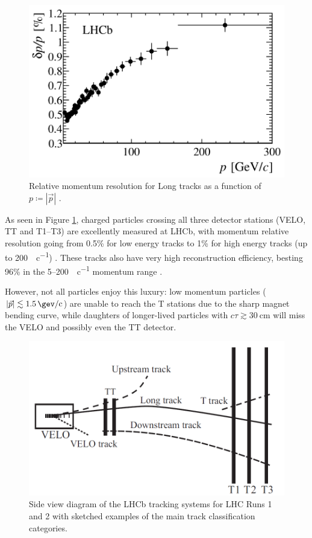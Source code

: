 \begin{figure}[t]
	\centering
	\includegraphics[width=.6\textwidth]{graphics/02-lhcb/tstation_p_resolution.png}
	\caption{Relative momentum resolution for Long tracks as a function of $p\coloneqq |\vec{p}|$ \cite{LHCbDetectorPerformance}.}
	\label{fig:2:tstation_p_resolution}
\end{figure}

As seen in Figure \ref{fig:2:tstation_p_resolution}, charged particles crossing all three detector stations (VELO, TT and T1--T3) are excellently measured at LHCb, with momentum relative resolution going from 0.5\% for low energy tracks to 1\% for high energy tracks  (up to \SI{200}{\gev\per c}) \cite{LHCbDetectorPerformance}.
These tracks also have very high reconstruction efficiency, besting 96\% in the 5--200~\si{\gev\per c} momentum range \cite{HistoryLHCb}.

However, not all particles enjoy this luxury:
low momentum particles ($|\vec{p}| \lesssim \SI{1.5}{\gev\per c}$) are unable to reach the T stations due to the sharp magnet bending curve, while daughters of longer-lived particles with $c\tau \gtrsim \SI{30}{\centi\meter}$ will miss the VELO and possibly even the TT detector.

\begin{figure}[t]
	\centering
	\includegraphics[width=.8\textwidth]{graphics/02-lhcb/Track_Definitions.png}
	\caption[Side view diagram of LHCb tracking system and track categories.]{Side view diagram of the LHCb tracking systems for LHC Runs 1 and 2 with sketched examples of the main track classification categories.}
	\label{fig:2:track_classification}
\end{figure}

